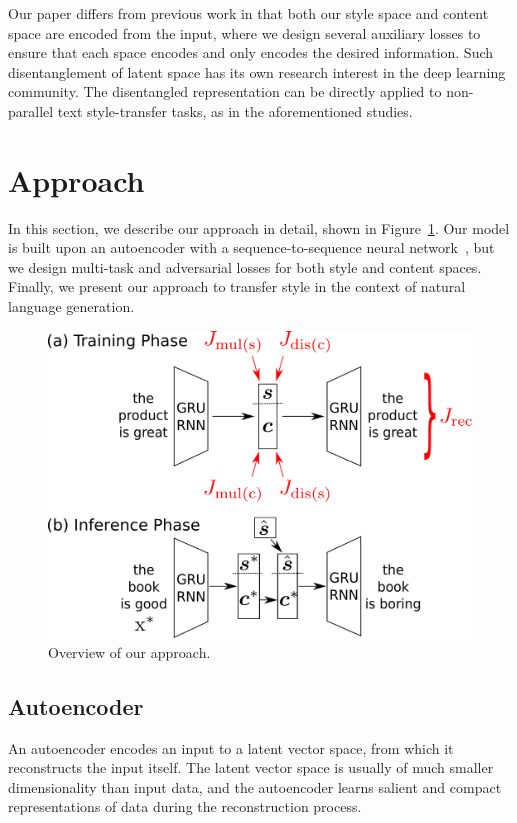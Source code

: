 \documentclass[letterpaper]{article} %
\begin{document}
Our paper differs from previous work in that both our style space and content space are encoded from the input, where we design several auxiliary losses to ensure that each space encodes and only encodes the desired information.
Such disentanglement of latent space has its own research interest in the deep learning community.
The disentangled representation can be directly applied to non-parallel text style-transfer tasks, as in the aforementioned studies.


\section{Approach}

In this section, we describe our approach in detail, shown in Figure~\ref{fig:overview}.
Our model is built upon an autoencoder with a sequence-to-sequence neural network~\cite{sutskever2014sequence}, but we design multi-task and adversarial losses for both style and content spaces.
Finally, we present our approach to transfer style in the context of natural language generation.

\begin{figure}[!t]
	\centering
	\includegraphics[width=.9\linewidth]{model-overview}
	\caption{Overview of our approach.}
	\label{fig:overview}
\end{figure}

\subsection{Autoencoder} \label{ssec:seq2seq-autoencoder}

An autoencoder encodes an input to a latent vector space, from which it reconstructs the input itself.
The latent vector space is usually of much smaller dimensionality than input data, and the autoencoder learns salient and compact representations of data during the reconstruction process.
\end{document}

